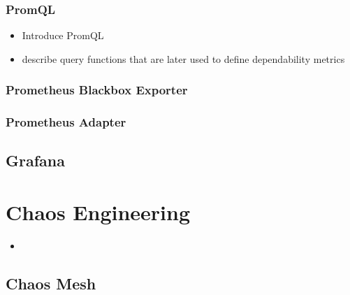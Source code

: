 \subsubsection{PromQL} \label{background-promql}

\begin{itemize}
	\item Introduce PromQL
	\item describe query functions that are later used to define dependability metrics
\end{itemize}

\subsubsection{Prometheus Blackbox Exporter}

\subsubsection{Prometheus Adapter}


\subsection{Grafana}


\section{Chaos Engineering}

\begin{itemize}
	\item 
\end{itemize}

\subsection{Chaos Mesh} \label{background-chaos-mesh}

